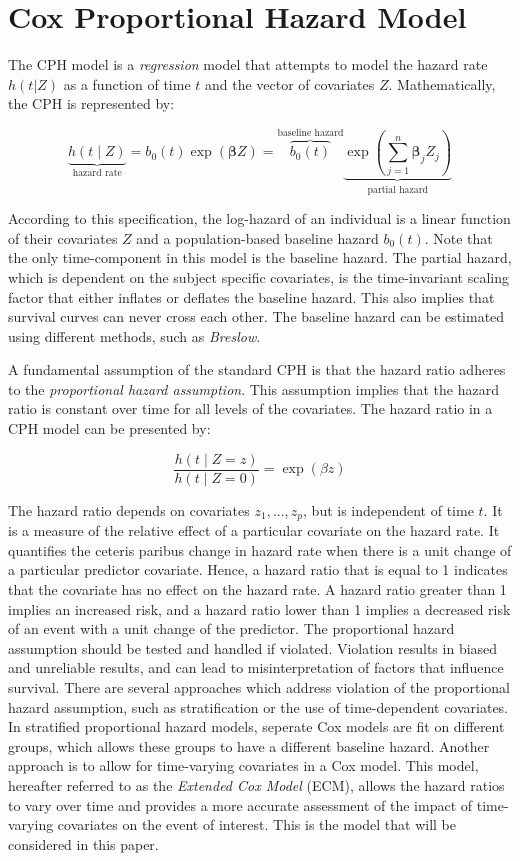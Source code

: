 \medskip
\section{Cox Proportional Hazard Model}
\label{section:methodology:CPH}
The CPH model is a \textit{regression} model that attempts to model the hazard rate $h(t|Z)$ as a function of time $t$ and the vector of covariates $Z$. Mathematically, the CPH is represented by: 

$$
\underbrace{h(t \mid Z)}_{\text{hazard rate}} =  b_0(t) \exp(\mathbf{\beta}Z)  = \overbrace{b_0(t)}^{\text{baseline hazard}} \underbrace{\exp \left(\sum_{j=1}^n \mathbf{\beta}_j Z_j\right)}_{\text{partial hazard}}
$$

According to this specification, the log-hazard of an individual is a linear function of their covariates $Z$ and a population-based baseline hazard $b_{0}(t)$. Note that the only time-component in this model is the baseline hazard. The partial hazard, which is dependent on the subject specific covariates, is the time-invariant scaling factor that either inflates or deflates the baseline hazard. This also implies that survival curves can never cross each other. The baseline hazard can be estimated using different methods, such as \textit{Breslow}. %

A fundamental assumption of the standard CPH is that the hazard ratio adheres to the \textit{proportional hazard assumption}. This assumption implies that the hazard ratio is constant over time for all levels of the covariates. The hazard ratio in a CPH model can be presented by: 

$$\frac{h(t \mid Z = z)}{h(t \mid Z = 0)} = \exp(\beta z)$$

The hazard ratio depends on covariates $z_1, ..., z_p$, but is independent of time $t$. It is a measure of the relative effect of a particular covariate on the hazard rate. It quantifies the ceteris paribus change in hazard rate when there is a unit change of a particular predictor covariate. Hence, a hazard ratio that is equal to 1 indicates that the covariate has no effect on the hazard rate. A hazard ratio greater than 1 implies an increased risk, and a hazard ratio lower than 1 implies a decreased risk of an event with a unit change of the predictor. The proportional hazard assumption should be tested and handled if violated. %
Violation results in biased and unreliable results, and can lead to misinterpretation of factors that influence survival. There are several approaches which address violation of the proportional hazard assumption, such as stratification or the use of time-dependent covariates. In stratified proportional hazard models, seperate Cox models are fit on different groups, which allows these groups to have a different baseline hazard. Another approach is to allow for time-varying covariates in a Cox model. This model, hereafter referred to as the \textit{Extended Cox Model} (ECM), allows the hazard ratios to vary over time and provides a more accurate assessment of the impact of time-varying covariates on the event of interest. This is the model that will be considered in this paper. 

